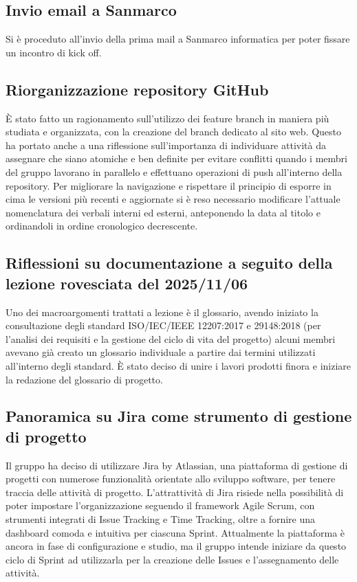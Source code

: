 \documentclass[a4paper,12pt]{article}
\begin{document}
\subsection{Invio email a Sanmarco}
Si è proceduto all'invio della prima mail a Sanmarco informatica per poter fissare un incontro di kick off.

\subsection{Riorganizzazione repository GitHub}
È stato fatto un ragionamento sull'utilizzo dei feature branch in maniera più studiata e organizzata, con la creazione del branch
dedicato al sito web. Questo ha portato anche a una riflessione sull'importanza di individuare attività da assegnare che siano 
atomiche e ben definite per evitare conflitti quando i membri del gruppo lavorano in parallelo e effettuano operazioni 
di push all'interno della repository.
Per migliorare la navigazione e rispettare il principio di esporre in cima le versioni più recenti e aggiornate si è reso necessario 
modificare l'attuale nomenclatura dei verbali interni ed esterni, anteponendo la data al titolo e ordinandoli in ordine cronologico 
decrescente.

\subsection{Riflessioni su documentazione a seguito della lezione rovesciata del 2025/11/06}
Uno dei macroargomenti trattati a lezione è il glossario, avendo iniziato la consultazione degli standard ISO/IEC/IEEE 12207:2017
e 29148:2018 (per l'analisi dei requisiti e la gestione del ciclo di vita del progetto) alcuni membri avevano già creato un 
glossario individuale a partire dai termini utilizzati all'interno degli standard. È stato deciso di unire i lavori prodotti 
finora e iniziare la redazione del glossario di progetto.

\subsection{Panoramica su Jira come strumento di gestione di progetto}
Il gruppo ha deciso di utilizzare Jira by Atlassian, una piattaforma di gestione di progetti con numerose funzionalità orientate
allo sviluppo software, per tenere traccia delle attività di progetto. L'attrattività di Jira risiede nella possibilità di poter 
impostare l'organizzazione seguendo il framework Agile Scrum, con strumenti integrati di Issue Tracking e Time Tracking,
oltre a fornire una dashboard comoda e intuitiva per ciascuna Sprint.
Attualmente la piattaforma è ancora in fase di configurazione e studio, ma il gruppo intende iniziare da questo ciclo di Sprint ad 
utilizzarla per la creazione delle Issues e l'assegnamento delle attività.
\end{document}
